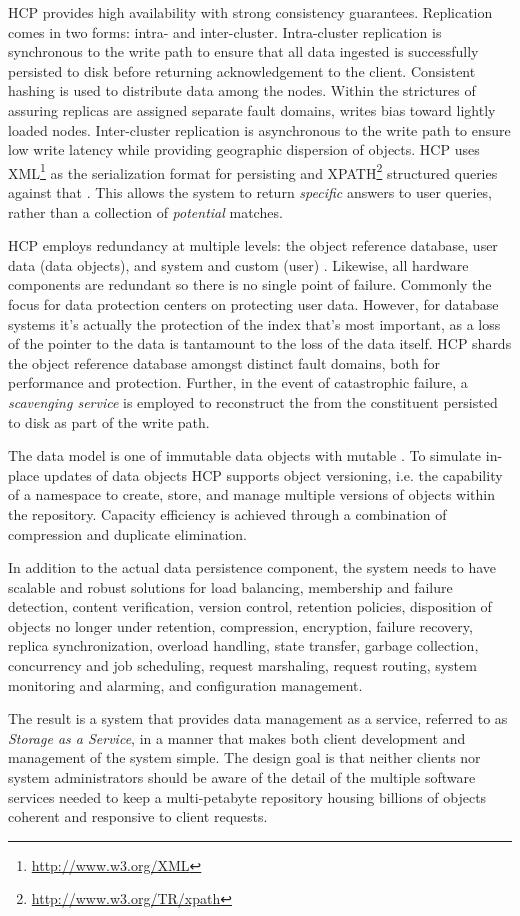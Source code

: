 HCP provides high availability with strong consistency guarantees. Replication comes in two forms: intra- and inter-cluster. Intra-cluster replication is synchronous to the write path to ensure that all data ingested is successfully persisted to disk before returning acknowledgement to the client. Consistent hashing is used to distribute data among the nodes. Within the strictures of assuring replicas are assigned separate fault domains, writes bias toward lightly loaded nodes. Inter-cluster replication is asynchronous to the write path to ensure low write latency while providing geographic dispersion of objects. HCP uses XML\footnote{{\href{http://www.w3.org/XML}{http://www.w3.org/XML}}} as the serialization format for persisting \cmd{} and XPATH\footnote{\href{http://www.w3.org/TR/xpath}{http://www.w3.org/TR/xpath}} structured queries against that \md{}. This allows the system to return \emph{specific} answers to user queries, rather than a collection of \emph{potential} matches.

HCP employs redundancy at multiple levels: the object reference database, user data (data objects), and system and custom (user) \md{}. Likewise, all hardware components are redundant so there is no single point of failure. Commonly the focus for data protection centers on protecting user data. However, for database systems it's actually the protection of the index that's most important, as a loss of the pointer to the data is tantamount to the loss of the data itself. HCP shards the object reference database amongst distinct fault domains, both for performance and protection. Further, in the event of catastrophic failure, a \emph{scavenging service} is employed to reconstruct the \db{} from the constituent \md{} persisted to disk as part of the write path.

The data model is one of immutable data objects with mutable \md{}. To simulate in-place updates of data objects HCP supports object versioning, i.e. the capability of a namespace to create, store, and manage multiple versions of objects within the repository. Capacity efficiency is achieved through a combination of compression and duplicate elimination.

In addition to the actual data persistence component, the system needs to have scalable and robust solutions for load balancing, membership and failure detection, content verification, version control, retention policies, disposition of objects no longer under retention, compression, encryption, failure recovery, replica synchronization, overload handling, state transfer, garbage collection, concurrency and job scheduling, request marshaling, request routing, system monitoring and alarming, and configuration management.

The result is a system that provides data management as a service, referred to as \emph{Storage as a Service}, in a manner that makes both client development and management of the system simple. The design goal is that neither clients nor system administrators should be aware of the detail of the multiple software services needed to keep a multi-petabyte repository housing billions of objects coherent and responsive to client requests.
